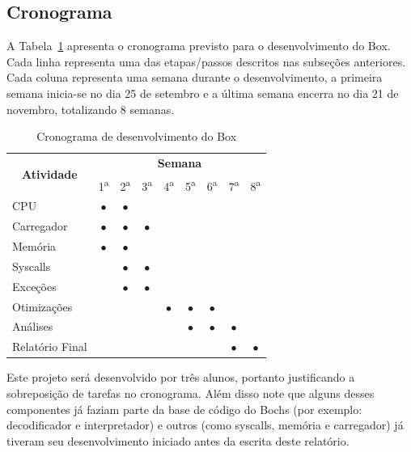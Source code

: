 \documentclass[11pt,twoside]{article}
\begin{document}
\subsection{Cronograma}

A Tabela~\ref{tab:cronograma} apresenta o cronograma previsto para o desenvolvimento do Box.
Cada linha representa uma das etapas/passos descritos nas subseções anteriores. Cada coluna representa
uma semana durante o desenvolvimento, a primeira semana inicia-se no dia 25 de setembro e a
última semana encerra no dia 21 de novembro, totalizando 8 semanas.

\begin{table}[h]
\centering
\begin{tabular}{|l|c|c|c|c|c|c|c|c|} \hline
\multicolumn{1}{|c|}{\multirow{2}{*}{\textbf{Atividade}}} & \multicolumn{8}{c|}{\textbf{Semana}} \\ \cline{2-9}
\multicolumn{1}{|c|}{} & 1\textsuperscript{a} & 2\textsuperscript{a} & 3\textsuperscript{a} & 4\textsuperscript{a} & 5\textsuperscript{a} & 6\textsuperscript{a} & 7\textsuperscript{a} & 8\textsuperscript{a} \\ \hline
CPU             & $\bullet$ & $\bullet$ &  &  &  &  &  &  \\ \hline
Carregador  	& $\bullet$ & $\bullet$ & $\bullet$ &  &  &  &  &  \\ \hline
Memória     	& $\bullet$ & $\bullet$ & &  &  &  &  &  \\ \hline
Syscalls    	&  & $\bullet$ & $\bullet$ &  &  &  &  &  \\ \hline
Exceções    	&  & $\bullet$ & $\bullet$ &  &  &  &  &  \\ \hline
Otimizações 	&  &  &  & $\bullet$ & $\bullet$ & $\bullet$ &  &  \\ \hline
Análises    	&  &  &  &  & $\bullet$ & $\bullet$ & $\bullet$ &  \\ \hline
Relatório Final	&  &  &  &  &  &  & $\bullet$ & $\bullet$ \\ \hline
\end{tabular}
\caption{Cronograma de desenvolvimento do Box}
\label{tab:cronograma}
\end{table}

Este projeto será desenvolvido por três alunos, portanto justificando a sobreposição
de tarefas no cronograma. Além disso note que alguns desses componentes já faziam 
parte da base de código do Bochs (por exemplo: decodificador e interpretador) e
outros (como syscalls, memória e carregador) já tiveram seu desenvolvimento iniciado
antes da escrita deste relatório.
\end{document}
